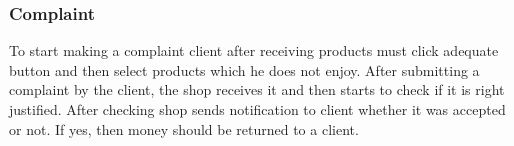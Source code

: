 \documentclass[../main.tex]{subfiles}
\begin{document}
\subsubsection{Complaint}
\vspace{5mm}
\vspace{5mm}


To start making a complaint client after receiving products must click adequate button and then select products which he does not enjoy. After submitting a complaint by the client, the shop receives it and then starts to check if it is right justified. After checking shop sends notification to client whether it was accepted or not. If yes, then money should be returned to a client.
\end{document}
